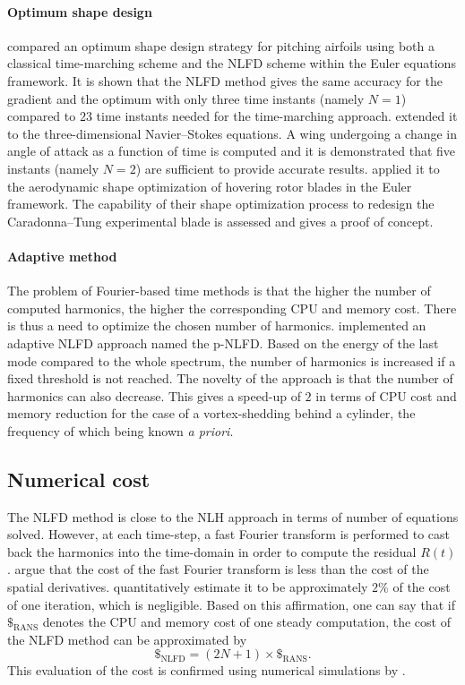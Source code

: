 \paragraph{Optimum shape design}
\citet{Nadarajah2003} compared an optimum shape design 
strategy for pitching airfoils 
using both a classical time-marching scheme
and the NLFD scheme within the Euler equations
framework. It is shown that the NLFD method
gives the same accuracy for the gradient and the optimum with only 
three time instants (namely $N=1$)
compared to $23$ time instants needed for 
the time-marching approach.
\citet{Nadarajah2007} extended it
to the three-dimensional Navier--Stokes equations.
A wing undergoing a change 
in angle of attack as a function of time is computed and
it is demonstrated that
five instants (namely $N=2$) are sufficient to provide
accurate results.
\citet{Tatossian2011} applied it
to the aerodynamic shape optimization of hovering rotor blades
in the Euler framework.
The capability of 
their shape optimization process
to redesign the Caradonna–Tung experimental 
blade is assessed and gives a proof
of concept.

\paragraph{Adaptive method}
The problem of Fourier-based time methods is that the higher
the number of computed harmonics, the higher the corresponding
CPU and memory cost. There is thus a need to optimize
the chosen number of harmonics.
\citet{Mosahebi2013} implemented an adaptive NLFD approach named
the p-NLFD. Based on the energy of the last mode compared
to the whole spectrum, the number of harmonics
is increased if a fixed threshold is not reached.
The novelty of the approach is that the number of
harmonics can also decrease.
This gives a speed-up of $2$ in terms of CPU cost and
memory reduction for the case of a
vortex-shedding behind a cylinder, the frequency of which
being known \emph{a priori}.

\subsection{Numerical cost}
The NLFD method is close to the NLH approach in terms of number
of equations solved. However, at each time-step, a fast Fourier transform
is performed to cast back the harmonics into the time-domain in order
to compute the residual $R(t)$. \citet{McMullen2006} argue
that the cost of the fast Fourier transform is less than the cost of 
the spatial derivatives. 
\citet{Kachra2008} quantitatively estimate it to be
approximately $2\%$ of the cost of one iteration, which is negligible.
Based on this affirmation, one can say that 
if $\mathdollar_{\text{RANS}}$ 
denotes the CPU and memory cost of
one steady computation, the cost of the NLFD method can be 
approximated by
\begin{equation}
	\mathdollar_{\text{NLFD}} = (2N+1) \times \mathdollar_{\text{RANS}}.
\end{equation}
This evaluation of the cost is confirmed using numerical
simulations by \citet{McMullen2002}.